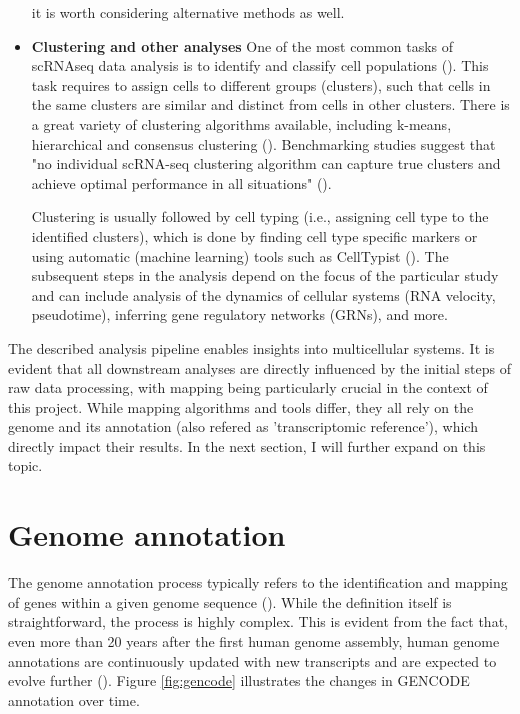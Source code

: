 \begin{itemize}
it is worth considering alternative methods as well.
\item \textbf{Clustering and other analyses}
One of the most common tasks of scRNAseq data analysis is to identify and classify cell populations (\cite{Andrews2018}).
This task requires to assign cells to different groups (clusters),
such that cells in the same clusters are similar and distinct from cells in other clusters.
There is a great variety of clustering algorithms available,
including k-means, hierarchical and consensus clustering (\cite{Peng2020}).
Benchmarking studies suggest that "no individual scRNA-seq clustering algorithm can capture true clusters and achieve
optimal performance in all situations" (\cite{Peng2020}).

Clustering is usually followed by cell typing (i.e., assigning cell type to the identified clusters),
which is done by finding cell type specific markers
or using automatic (machine learning) tools such as CellTypist (\cite{Dom2022}).
The subsequent steps in the analysis depend on the focus of the particular study and can include
analysis of the dynamics of cellular systems (RNA velocity, pseudotime),
inferring gene regulatory networks (GRNs), and more.
\end{itemize}

The described analysis pipeline enables insights into multicellular systems.
It is evident that all downstream analyses are directly influenced by the initial steps of raw data processing,
with mapping being particularly crucial in the context of this project.
While mapping algorithms and tools differ, they all rely on the genome and its annotation (also refered as 'transcriptomic reference'),
which directly impact their results.
In the next section, I will further expand on this topic.

\section{Genome annotation}

The genome annotation process typically refers to the identification and mapping of genes within a given genome sequence (\cite{Guigo2023}).
While the definition itself is straightforward, the process is highly complex.
This is evident from the fact that, even more than 20 years after the first human genome assembly,
human genome annotations are continuously updated with new transcripts and are expected to evolve further (\cite{Mudge2024}).
Figure \ref{fig:gencode} illustrates the changes in GENCODE annotation over time.

